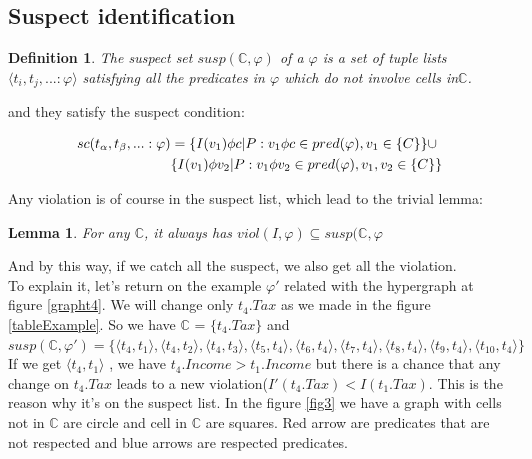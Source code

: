 \documentclass[letterpaper, 12pt]{report}
\newtheorem{mydef}{Definition}
\newtheorem{mylemma}{Lemma}
\begin{document}
\subsection{Suspect identification}

\begin{mydef} \cite{main}
	The suspect set $susp(\mathbb{C},\varphi)$ of a $\varphi$ is a set of tuple lists $\langle t_i,t_j,...:\varphi \rangle$ satisfying all the predicates in $\varphi$ which do not involve cells in$\mathbb{C}$.
\end{mydef}

and they satisfy the suspect condition:

\begin{displaymath}
\begin{split}
sc(t_\alpha,t_\beta,...:\varphi) &= \{I(v_1)\phi c| P: v_1 \phi c \in pred(\varphi),v_1 \in \mathbb\{C\}\}\cup \\
	&\{I(v_1)\phi v_2| P: v_1 \phi v_2 \in pred(\varphi),v_1,v_2 \in \mathbb\{C\}\}
\end{split}
\end{displaymath}

Any violation is of course in the suspect list, which lead to the trivial lemma:

\begin{mylemma}
	For any $\mathbb{C}$, it always has $viol(I,\varphi) \subseteq susp(\mathbb{C},\varphi$
\end{mylemma}

And by this way, if we catch all the suspect, we also get all the violation.\\

To explain it, let's return on the example $\varphi'$ related with the hypergraph at figure \ref{grapht4}. We will change only $t_4.Tax$ as we made in the figure \ref{tableExample}. So we have $\mathbb{C}$ =  $\{ t_4.Tax \}$ and $susp(\mathbb{C},\varphi') = \{\langle t_4 , t_1\rangle , 
\langle t_4 , t_2\rangle,
\langle t_4 , t_3\rangle,
\langle t_5 , t_4\rangle,
\langle t_6 , t_4\rangle,
\langle t_7 , t_4\rangle,
\langle t_8 , t_4\rangle,
\langle t_9 , t_4\rangle,
\langle t_{10} , t_4\rangle \}$ If we get $\langle t_4 , t_1\rangle$ ,   we have $t_4.Income > t_1.Income$ but there is a chance that any change on $t_4.Tax$ leads to a new violation($I'(t_4.Tax)<I(t_1.Tax) $. This is the reason why it's on the suspect list. In the figure \ref{fig3} we have a graph with cells not in $\mathbb{C}$ are circle and cell in $\mathbb{C}$ are squares. Red arrow are predicates that are not respected and blue arrows are respected predicates.
\end{document}
